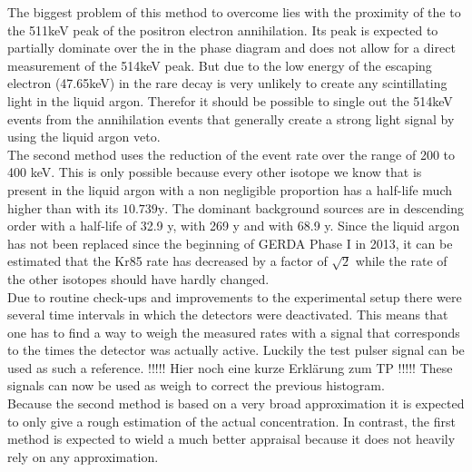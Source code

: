 The biggest problem of this method to overcome lies with the proximity of the  to the 511keV peak of the positron electron annihilation. 
Its peak is expected to partially dominate over the  in the phase diagram and does not allow for a direct measurement of the 514keV peak. 
But due to the low energy of the escaping electron (47.65keV) in the rare decay is very unlikely to create any scintillating light in the liquid argon. 
Therefor it should be possible to single out the 514keV events from the annihilation events that generally create a strong light signal by using the liquid argon veto.
\\

The second method uses the reduction of the event rate over the range of 200 to 400 keV. 
This is only possible because every other isotope we know that is present in the liquid argon with a non negligible proportion has a half-life much higher than  with its \(10.739\mathrm{y}\). 
The dominant background sources are in descending order  with a half-life of 32.9 y,  with 269 y and  with 68.9 y. 
Since the liquid argon has not been replaced since the beginning of GERDA Phase I in 2013, it can be estimated that the Kr85 rate has decreased by a factor of \(\sqrt{2}\) while the rate of the other isotopes should have hardly changed.
\\

Due to routine check-ups and improvements to the experimental setup there were several time intervals in which the detectors were deactivated. 
This means that one has to find a way to weigh the measured rates with a signal that corresponds to the times the detector was actually active. 
Luckily the test pulser signal can be used as such a reference. 
!!!!! Hier noch eine kurze Erklärung zum TP !!!!!
These signals can now be used as weigh to correct the previous histogram.
\\

Because the second method is based on a very broad approximation it is expected to only give a rough estimation of the actual concentration. 
In contrast, the first method is expected to wield a much better appraisal because it does not heavily rely on any approximation.
\\

